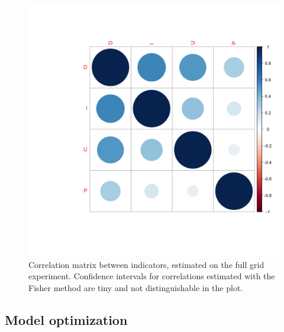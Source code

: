 \documentclass[letterpaper]{article}
\begin{document}
\begin{figure}[t]
	\centering
	\includegraphics[width=\linewidth,trim={6cm 6cm 0 6cm}]{figures/corrmat_indics.png}
	\caption{Correlation matrix between indicators, estimated on the full grid experiment. Confidence intervals for correlations estimated with the Fisher method are tiny and not distinguishable in the plot.\label{fig:cormat}}
\end{figure}


\subsection{Model optimization}
\end{document}
